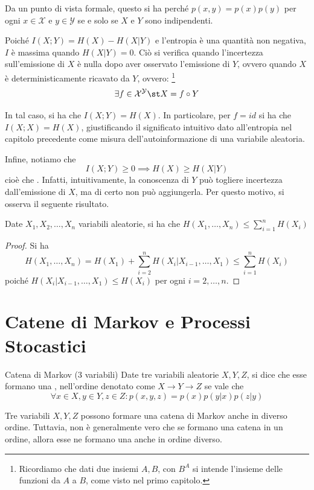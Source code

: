 Da un punto di vista formale, questo si ha perché \(p(x,y)=p(x)p(y)\) per ogni \(x \in \mathcal{X}\) e \(y \in \mathcal{Y}\) se e solo se \(X\) e \(Y\) sono indipendenti.

Poiché \(I(X;Y) = H(X) - H(X|Y)\) e l'entropia è una quantità non negativa, $I$ è massima quando $H(X|Y)=0$. Ciò si verifica quando l'incertezza sull'emissione di $X$ è nulla dopo aver osservato l'emissione di $Y$, ovvero quando $X$ è deterministicamente ricavato da $Y$, ovvero: \footnote{Ricordiamo che dati due insiemi \(A,B\), con \(B^A\) si intende l'insieme delle funzioni da \(A\) a \(B\), come visto nel primo capitolo.}
\[\exists f \in \mathcal{X}^\mathcal{Y} \st X= f\circ Y\]

In tal caso, si ha che \(I(X;Y) = H(X)\).
In particolare, per \(f = id\) si ha che \(I(X;X) = H(X)\), giustificando il significato intuitivo dato all'entropia nel capitolo precedente come misura dell'autoinformazione di una variabile aleatoria.

Infine, notiamo che
\[I(X;Y)\geq 0 \implies H(X) \geq H(X|Y)\]
cioè che . Infatti, intuitivamente, la conoscenza di $Y$ può togliere incertezza dall'emissione di $X$, ma di certo non può aggiungerla. Per questo motivo, si osserva il seguente risultato.

\begin{proposition}{}
  Date \(X_1, X_2, \ldots, X_n\) variabili aleatorie, si ha che
  \(H(X_1, \ldots, X_n)\leq \sum_{i=1}^n H(X_i)\)
\end{proposition}
\begin{proof}
  Si ha
  \[H(X_1, \ldots, X_n) = H(X_1) + \sum_{i=2}^{n}H(X_i|X_{i-1}, \ldots, X_1)\leq \sum_{i=1}^n H(X_i)\]
  poiché \(H(X_i|X_{i-1}, \ldots, X_1) \leq H(X_i)\) per ogni \(i=2,\ldots,n\).
\end{proof}

\section{Catene di Markov e Processi Stocastici}

\begin{definition}{Catena di Markov (3 variabili)}
  Date tre variabili aleatorie \(X, Y, Z\), si dice che esse formano una , nell'ordine denotato come \(X \to Y \to Z\) se vale che
  \[\forall x \in X, y \in Y, z \in Z: p(x,y,z) = p(x)p(y|x)p(z|y)\]
\end{definition}
Tre variabili $X,Y,Z$ possono formare una catena di Markov anche in diverso ordine. Tuttavia, non è generalmente vero che se formano una catena in un ordine, allora esse ne formano una anche in ordine diverso.

